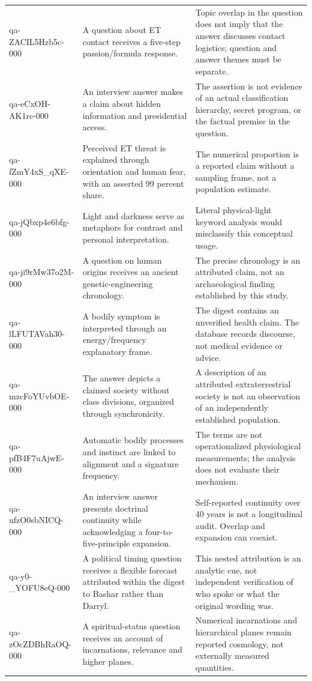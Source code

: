 \begin{longtable}{p{}p{}p{}}
qa-ZACIL5Hzb5c-000 & A question about ET contact receives a five-step passion/formula response. & Topic overlap in the question does not imply that the answer discusses contact logistics; question and answer themes must be separate. \\
qa-eCxOH-AK1rc-000 & An interview answer makes a claim about hidden information and presidential access. & The assertion is not evidence of an actual classification hierarchy, secret program, or the factual premise in the question. \\
qa-fZmY4xS\_qXE-000 & Perceived ET threat is explained through orientation and human fear, with an asserted 99 percent share. & The numerical proportion is a reported claim without a sampling frame, not a population estimate. \\
qa-jQbxp4e6bfg-000 & Light and darkness serve as metaphors for contrast and personal interpretation. & Literal physical-light keyword analysis would misclassify this conceptual usage. \\
qa-ji9rMw37o2M-000 & A question on human origins receives an ancient genetic-engineering chronology. & The precise chronology is an attributed claim, not an archaeological finding established by this study. \\
qa-lLFUTAVah30-000 & A bodily symptom is interpreted through an energy/frequency explanatory frame. & The digest contains an unverified health claim. The database records discourse, not medical evidence or advice. \\
qa-mzcFoYUvbOE-000 & The answer depicts a claimed society without class divisions, organized through synchronicity. & A description of an attributed extraterrestrial society is not an observation of an independently established population. \\
qa-pfB4F7uAjwE-000 & Automatic bodily processes and instinct are linked to alignment and a signature frequency. & The terms are not operationalized physiological measurements; the analysis does not evaluate their mechanism. \\
qa-ufzO0sbNICQ-000 & An interview answer presents doctrinal continuity while acknowledging a four-to-five-principle expansion. & Self-reported continuity over 40 years is not a longitudinal audit. Overlap and expansion can coexist. \\
qa-y0-\_YOFU8eQ-000 & A political timing question receives a flexible forecast attributed within the digest to Bashar rather than Darryl. & This nested attribution is an analytic cue, not independent verification of who spoke or what the original wording was. \\
qa-zOcZDBhRaOQ-000 & A spiritual-status question receives an account of incarnations, relevance and higher planes. & Numerical incarnations and hierarchical planes remain reported cosmology, not externally measured quantities. \\
\bottomrule
\end{longtable}
\endgroup
